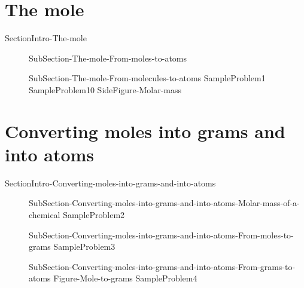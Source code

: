 \documentclass[main.tex]{subfiles}
\newcommand\chapterlabel{Ch-mole}\setcounter{figurenewcounter}{0}\setcounter{tablenewcounter}{0}\setcounter{formulanewcounter}{0}\chapterpicture{../{\chapterlabel}/figure1}\chapterpicturelabel{PngImg}
\begin{document}
\section{The mole}
{SectionIntro-The-mole}
\sloppy \begin{description}
\item[] {SubSection-The-mole-From-moles-to-atoms}
\item[] {SubSection-The-mole-From-molecules-to-atoms}
  \hspace{-3cm}{Figure-The-mole}
{SampleProblem1}
{SampleProblem10}
{SideFigure-Molar-mass}
\end{description}
	



\section{Converting moles into grams and into atoms}
{SectionIntro-Converting-moles-into-grams-and-into-atoms}
\sloppy \begin{description}
\item[] {SubSection-Converting-moles-into-grams-and-into-atoms-Molar-mass-of-a-chemical}
{SampleProblem2}
\item[] {SubSection-Converting-moles-into-grams-and-into-atoms-From-moles-to-grams}
 \hspace{2cm}{Figure-Mole-equivalency}
{SampleProblem3}
\item[] {SubSection-Converting-moles-into-grams-and-into-atoms-From-grams-to-atoms}
{Figure-Mole-to-grams}
{SampleProblem4}
\end{description}
\end{document}
